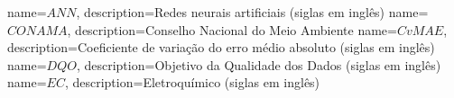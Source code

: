 

{
    name=$ ANN $,
    description={Redes neurais artificiais (siglas em inglês)}
}
{
    name=$ CONAMA $,
    description={Conselho Nacional do Meio Ambiente}
}
{
    name=$ CvMAE $,
    description={Coeficiente de variação do erro médio absoluto (siglas em inglês)}
}
{
    name=$ DQO $,
    description={Objetivo da Qualidade dos Dados (siglas em inglês)}
}
{
    name=$ EC $,
    description={Eletroquímico (siglas em inglês)}
}

